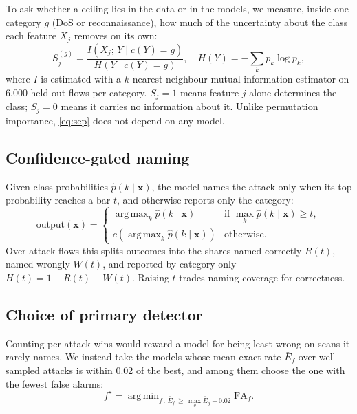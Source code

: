 \documentclass[conference]{IEEEtran}
\DeclareMathOperator*{\argmax}{arg\,max}
\DeclareMathOperator*{\argmin}{arg\,min}
\begin{document}
To ask whether a ceiling lies in the data or in the models, we measure, inside one category $g$ (DoS or reconnaissance), how much of the uncertainty about the class each feature $X_j$ removes on its own:
\begin{equation}
S_j^{(g)} = \frac{I\!\left(X_j;\,Y \mid c(Y)=g\right)}{H\!\left(Y \mid c(Y)=g\right)}, \quad
H(Y) = -\sum_k p_k \log p_k,
\label{eq:sep}
\end{equation}
where $I$ is estimated with a $k$-nearest-neighbour mutual-information estimator on 6,000 held-out flows per category. $S_j = 1$ means feature $j$ alone determines the class; $S_j = 0$ means it carries no information about it. Unlike permutation importance, \eqref{eq:sep} does not depend on any model.

\subsection{Confidence-gated naming}

Given class probabilities $\hat{p}(k \mid \mathbf{x})$, the model names the attack only when its top probability reaches a bar $t$, and otherwise reports only the category:
\begin{equation}
\text{output}(\mathbf{x}) =
\begin{cases}
\argmax_k \hat{p}(k\mid\mathbf{x}) & \text{if } \max_k \hat{p}(k\mid\mathbf{x}) \ge t,\\
c\!\left(\argmax_k \hat{p}(k\mid\mathbf{x})\right) & \text{otherwise.}
\end{cases}
\label{eq:gate}
\end{equation}
Over attack flows this splits outcomes into the shares named correctly $R(t)$, named wrongly $W(t)$, and reported by category only $H(t) = 1 - R(t) - W(t)$. Raising $t$ trades naming coverage for correctness.

\subsection{Choice of primary detector}

Counting per-attack wins would reward a model for being least wrong on scans it rarely names. We instead take the models whose mean exact rate $\bar{E}_f$ over well-sampled attacks is within 0.02 of the best, and among them choose the one with the fewest false alarms:
\begin{equation}
f^{\star} = \argmin_{f\,:\,\bar{E}_f \,\ge\, \max_g \bar{E}_g - 0.02} \text{FA}_f .
\label{eq:primary}
\end{equation}
\end{document}
